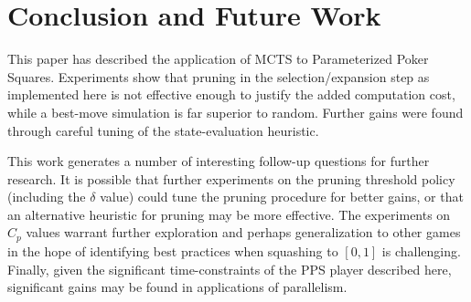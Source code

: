 \documentclass[letterpaper]{article}
\begin{document}



\section{Conclusion and Future Work}

This paper has described the application of MCTS to Parameterized Poker Squares. Experiments show that pruning in the selection/expansion step as implemented here is not effective enough to justify the added computation cost, while a best-move simulation is far superior to random. Further gains were found through careful tuning of the state-evaluation heuristic.

This work generates a number of interesting follow-up questions for further research. It is possible that further experiments on the pruning threshold policy (including the $\delta$ value) could tune the pruning procedure for better gains, or that an alternative heuristic for pruning may be more effective. The experiments on $C_p$ values warrant further exploration and perhaps generalization to other games in the hope of identifying best practices when squashing to $[0,1]$ is challenging. Finally, given the significant time-constraints of the PPS player described here, significant gains may be found in applications of parallelism.
\end{document}
